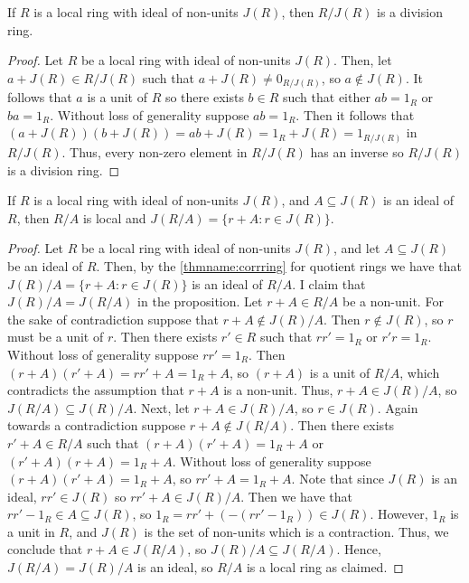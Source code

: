 \documentclass[12pt, a4paper, oneside, openright, titlepage]{book}
\begin{document}
\begin{prop}
    If $R$ is a local ring with ideal of non-units $J(R)$, then $R/J(R)$ is a division ring.
    \begin{proof}
        Let $R$ be a local ring with ideal of non-units $J(R)$. Then, let $a+J(R) \in R/J(R)$ such that $a+J(R) \neq 0_{R/J(R)}$, so $a \notin J(R)$. It follows that $a$ is a unit of $R$ so there exists $b \in R$ such that either $ab = 1_R$ or $ba = 1_R$. Without loss of generality suppose $ab = 1_R$. Then it follows that $(a+J(R))(b+J(R)) = ab+J(R) = 1_R + J(R) = 1_{R/J(R)}$ in $R/J(R)$. Thus, every non-zero element in $R/J(R)$ has an inverse so $R/J(R)$ is a division ring.
    \end{proof}
\end{prop}

\begin{prop}
    If $R$ is a local ring with ideal of non-units $J(R)$, and $A \subseteq J(R)$ is an ideal of $R$, then $R/A$ is local and $J(R/A) = \{r+A:r \in J(R)\}$.
    \begin{proof}
        Let $R$ be a local ring with ideal of non-units $J(R)$, and let $A \subseteq J(R)$ be an ideal of $R$. Then, by the \ref{thmname:corrring} for quotient rings we have that $J(R)/A = \{r + A: r \in J(R)\}$ is an ideal of $R/A$. I claim that $J(R)/A = J(R/A)$ in the proposition. Let $r+A \in R/A$ be a non-unit. For the sake of contradiction suppose that $r+A \notin J(R)/A$. Then $r \notin J(R)$, so $r$ must be a unit of $r$. Then there exists $r' \in R$ such that $rr' = 1_R$ or $r'r = 1_R$. Without loss of generality suppose $rr' = 1_R$. Then $(r+A)(r'+A) = rr'+A = 1_R+A$, so $(r+A)$ is a unit of $R/A$, which contradicts the assumption that $r+A$ is a non-unit. Thus, $r+A \in J(R)/A$, so $J(R/A) \subseteq J(R)/A$. Next, let $r + A \in J(R)/A$, so $r \in J(R)$. Again towards a contradiction suppose $r + A \notin J(R/A)$. Then there exists $r'+A \in R/A$ such that $(r+A)(r'+A) = 1_R+A$ or $(r'+A)(r+A) = 1_R +A$. Without loss of generality suppose $(r+A)(r'+A) = 1_R +A$, so $rr' + A = 1_R + A$. Note that since $J(R)$ is an ideal, $rr' \in J(R)$ so $rr' + A \in J(R)/A$. Then we have that $rr' - 1_R \in A \subseteq J(R)$, so $1_R = rr' + (-(rr' - 1_R)) \in J(R)$. However, $1_R$ is a unit in $R$, and $J(R)$ is the set of non-units which is a contraction. Thus, we conclude that $r+A \in J(R/A)$, so $J(R)/A \subseteq J(R/A)$. Hence, $J(R/A) = J(R)/A$ is an ideal, so $R/A$ is a local ring as claimed. 
    \end{proof}
\end{prop}
\end{document}
